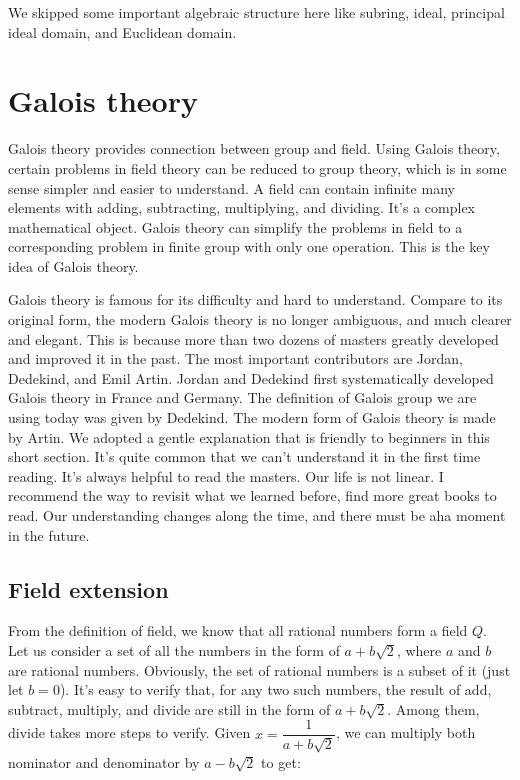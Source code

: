 \documentclass[b5paper]{article}
\begin{document}
We skipped some important algebraic structure here like subring, ideal, principal ideal domain, and Euclidean domain.

\section{Galois theory}

Galois theory provides connection between group and field. Using Galois theory, certain problems in field theory can be reduced to group theory, which is in some sense simpler and easier to understand. A field can contain infinite many elements with adding, subtracting, multiplying, and dividing. It's a complex mathematical object. Galois theory can simplify the problems in field to a corresponding problem in finite group with only one operation. This is the key idea of Galois theory.

Galois theory is famous for its difficulty and hard to understand. Compare to its original form, the modern Galois theory is no longer ambiguous, and much clearer and elegant. This is because more than two dozens of masters greatly developed and improved it in the past. The most important contributors are Jordan, Dedekind, and Emil Artin. Jordan and Dedekind first systematically developed Galois theory in France and Germany. The definition of Galois group we are using today was given by Dedekind. The modern form of Galois theory is made by Artin\cite{ZhangPu2013}. We adopted a gentle explanation that is friendly to beginners\cite{Stillwell1994} in this short section. It's quite common that we can't understand it in the first time reading. It's always helpful to read the masters. Our life is not linear. I recommend the way to revisit what we learned before, find more great books to read. Our understanding changes along the time, and there must be aha moment in the future.

\subsection{Field extension}

From the definition of field, we know that all rational numbers form a field $Q$. Let us consider a set of all the numbers in the form of $a + b\sqrt{2}$, where $a$ and $b$ are rational numbers\cite{Goodman2011}. Obviously, the set of rational numbers is a subset of it (just let $b = 0$). It's easy to verify that, for any two such numbers, the result of add, subtract, multiply, and divide are still in the form of $a + b \sqrt{2}$. Among them, divide takes more steps to verify. Given $x = \dfrac{1}{a + b\sqrt{2}}$, we can multiply both nominator and denominator by $a - b \sqrt{2}$ to get:
\end{document}
